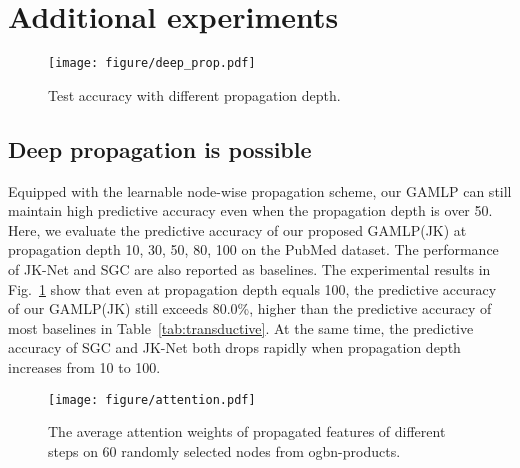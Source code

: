 \documentclass[sigconf]{acmart}
\begin{document}
\section{Additional experiments}
\label{more-exp}
\begin{figure}[tpb!]
    \centering
    \vspace{-4mm}
    \texttt{[image: figure/deep\_prop.pdf]}
    \vspace{-4mm}
    \caption{Test accuracy with different propagation depth.}
    \vspace{-4mm}
    \label{fig:deep_prop}
\end{figure}


\subsection{Deep propagation is possible }
\label{deep-pro}
Equipped with the learnable node-wise propagation scheme, our GAMLP can still maintain high predictive accuracy even when the propagation depth is over 50.
Here, we evaluate the predictive accuracy of our proposed GAMLP(JK) at propagation depth 10, 30, 50, 80, 100 on the PubMed dataset.
The performance of JK-Net and SGC are also reported as baselines.
The experimental results in Fig.~\ref{fig:deep_prop} show that even at propagation depth equals 100, the predictive accuracy of our GAMLP(JK) still exceeds 80.0\%, higher than the predictive accuracy of most baselines in Table~\ref{tab:transductive}.
At the same time, the predictive accuracy of SGC and JK-Net both drops rapidly when propagation depth increases from 10 to 100.


\begin{figure}[tpb!]
    \centering
    \texttt{[image: figure/attention.pdf]}
    \vspace{-4mm}
    \caption{The average attention weights of propagated features of different steps on 60 randomly selected nodes from ogbn-products. }
    \vspace{-4mm}
    \label{interpretability}
\end{figure}
\end{document}

